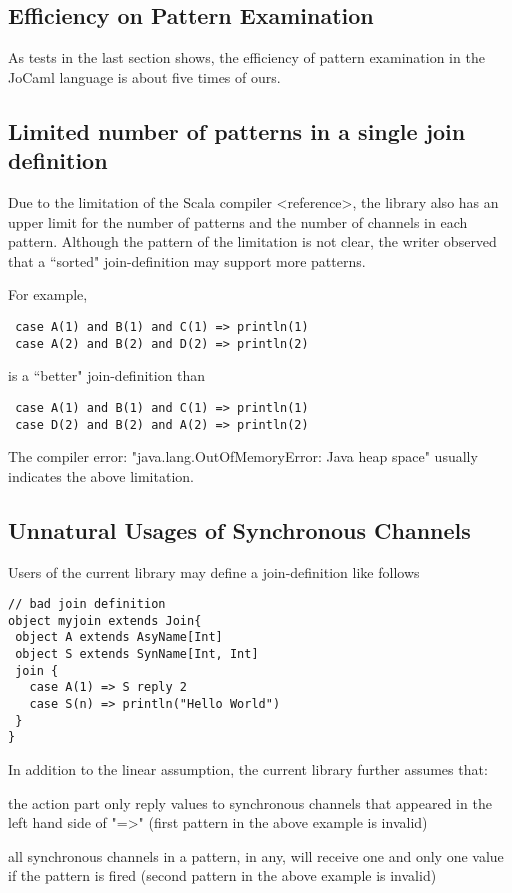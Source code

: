 \subsection{Efficiency on Pattern Examination}
As tests in the last section shows, the efficiency of pattern examination in the JoCaml language is about five times of ours.  

\subsection{Limited number of patterns in a single join definition}
Due to the limitation of the Scala compiler <reference>, the library also has an upper limit for the number of patterns and the number of channels in each pattern.  Although the pattern of the limitation is not clear, the writer observed that a ``sorted" join-definition may support more patterns.

For example,
\begin{lstlisting}
 case A(1) and B(1) and C(1) => println(1)
 case A(2) and B(2) and D(2) => println(2)
\end{lstlisting}
is a ``better" join-definition than
\begin{lstlisting}
 case A(1) and B(1) and C(1) => println(1)
 case D(2) and B(2) and A(2) => println(2)
\end{lstlisting}
The compiler error: "java.lang.OutOfMemoryError: Java heap space" usually indicates the above limitation.

\subsection{Unnatural Usages of Synchronous Channels}

Users of the current library may define a join-definition like follows
\begin{lstlisting}
// bad join definition
object myjoin extends Join{
 object A extends AsyName[Int]
 object S extends SynName[Int, Int]
 join {
   case A(1) => S reply 2
   case S(n) => println("Hello World")
 }
}
\end{lstlisting}

In addition to the linear assumption, the current library further assumes that:
\begin{inparaenum}[(i)]
  \item  the action part only reply values to synchronous channels that appeared in the left hand side of "=>" (first pattern in the above example is invalid)
  \item all synchronous channels in a pattern, in any, will receive one and only one value if the pattern is fired  (second pattern in the above example is invalid)
\end{inparaenum}

